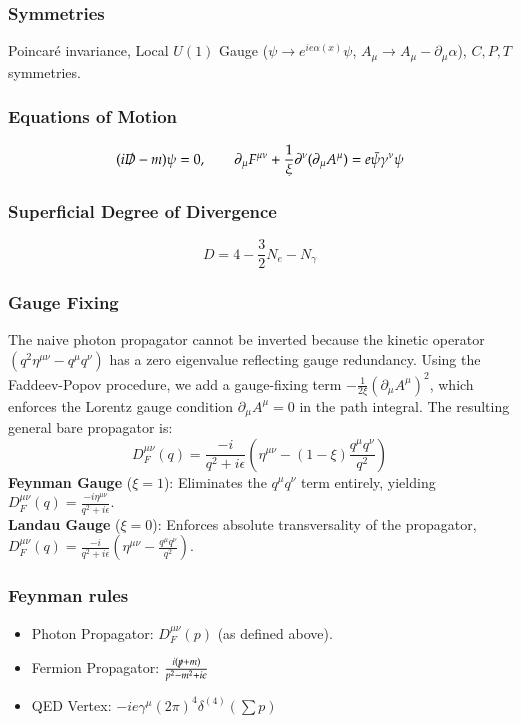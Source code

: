 \documentclass{article}
\begin{document}
\subsubsection*{Symmetries}
Poincar\'{e} invariance, Local $U(1)$ Gauge ($\psi \to e^{ie\alpha(x)}\psi$, $A_\mu \to A_\mu - \partial_\mu \alpha$), $C, P, T$ symmetries.
\subsubsection*{Equations of Motion}
\begin{equation}
    (i\slashed{D} - m)\psi = 0, \qquad \partial_\mu F^{\mu\nu} + \frac{1}{\xi}\partial^\nu(\partial_\mu A^\mu) = e\bar{\psi}\gamma^\nu\psi
\end{equation}
\subsubsection*{Superficial Degree of Divergence}
\begin{equation}
    D = 4 - \frac{3}{2}N_e - N_\gamma
\end{equation}
\subsubsection*{Gauge Fixing}
The naive photon propagator cannot be inverted because the kinetic operator $(q^2 \eta^{\mu\nu} - q^\mu q^\nu)$ has a zero eigenvalue reflecting gauge redundancy. Using the Faddeev-Popov procedure, we add a gauge-fixing term $-\frac{1}{2\xi}(\partial_\mu A^\mu)^2$, which enforces the Lorentz gauge condition $\partial_\mu A^\mu = 0$ in the path integral. The resulting general bare propagator is:
\begin{equation}
    D_F^{\mu\nu}(q) = \frac{-i}{q^2 + i\epsilon}\left(\eta^{\mu\nu} - (1 - \xi)\frac{q^\mu q^\nu}{q^2}\right)
\end{equation}
\textbf{Feynman Gauge} ($\xi = 1$): Eliminates the $q^\mu q^\nu$ term entirely, yielding $D_F^{\mu\nu}(q) = \frac{-i\eta^{\mu\nu}}{q^2 + i\epsilon}$. \\
\textbf{Landau Gauge} ($\xi = 0$): Enforces absolute transversality of the propagator, $D_F^{\mu\nu}(q) = \frac{-i}{q^2 + i\epsilon}\left(\eta^{\mu\nu} - \frac{q^\mu q^\nu}{q^2}\right)$.
\subsubsection*{Feynman rules}
\begin{itemize}
    \item Photon Propagator: $D_F^{\mu\nu}(p)$ (as defined above).
    \item Fermion Propagator: $\frac{i(\slashed{p}+m)}{p^2-m^2+i\epsilon}$
    \item QED Vertex: $-ie\gamma^\mu (2\pi)^4\delta^{(4)}(\sum p)$
\end{itemize}
\end{document}

